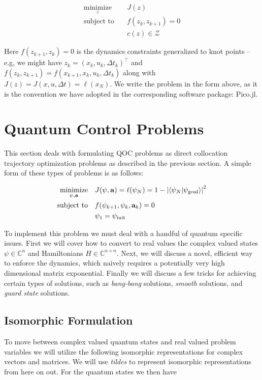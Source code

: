 \documentclass{article}
\newcommand{\minimize}[1]{\underset{#1}{\text{minimize}}}
\newcommand{\st}{\text{subject to}}
\begin{document}
\begin{align}
  \minimize{z} \quad & J(z) \\
  \st \quad & f(z_k, z_{k+1}) = 0 \\
            & c(z) \in \mathcal{Z} 
\end{align}

Here $f(z_{k+1}, z_k) = 0$ is the dynamics constraints generalized to knot points -- e.g, we might have $z_k = (x_k, u_k, \Delta t_k)^\top$ and $f(z_k, z_{k+1}) = f(x_{k+1}, x_k, u_k, \Delta t_k)$ along with $J(z) = J(x, u, \Delta t) = \ell(x_N)$. We write the problem in the form above, as it is the convention we have adopted in the corresponding software package: Pico.jl. 



\section{Quantum Control Problems}

This section deals with formulating QOC problems as direct collocation trajectory optimization problems as described in the previous section. A simple form of these types of problems is as follows:

\begin{align}
  \minimize{\psi, \vb{a}} \quad & J(\psi, \vb{a}) = \ell(\psi_N) = 1 - \abs{\braket{\psi_N}{\psi_{\text{goal}}}}^2 \\
  \st \quad & f(\psi_{k+1}, \psi_k, \vb{a}_k) = 0 \\
            & \psi_1 = \psi_{\text{init}} 
\end{align}



To implement this problem we must deal with a handful of quantum specific issues.  First we will cover how to convert to real values the complex valued states $\psi \in \mathbb{C}^n$ and Hamiltonians $H \in \mathbb{C}^{n \times n}$.  Next, we will discuss a novel, efficient way to enforce the dynamics, which naively requires a potentially very high dimensional matrix exponential. Finally we will discuss a few tricks for achieving certain types of solutions, such as \textit{bang-bang} solutions, \textit{smooth} solutions, and \textit{guard state} solutions. 




\subsection{Isomorphic Formulation}
To move between complex valued quantum states and real valued problem variables we will utilize the following isomorphic representations for complex vectors and matrices.  We will use \textit{tildes} to represent isomorphic representations from here on out. For the quantum states we then have
\end{document}
